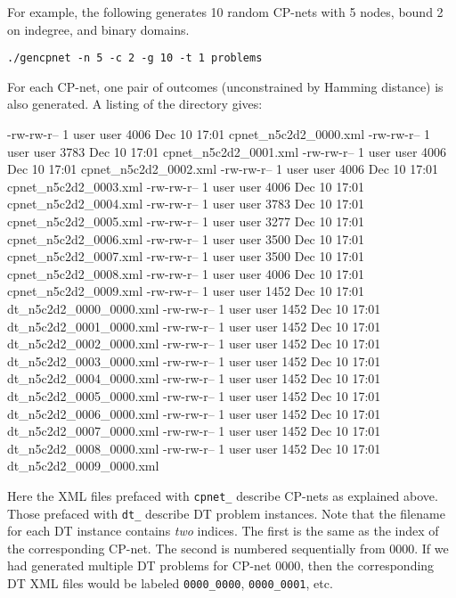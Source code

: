 \documentclass{article}
\begin{document}
For example, the following generates 10 random CP-nets with 5 nodes,
bound 2 on indegree, and binary domains.  
\begin{verbatim}
./gencpnet -n 5 -c 2 -g 10 -t 1 problems
\end{verbatim}
For each CP-net, one pair of
outcomes (unconstrained by Hamming distance) is also generated. 
A listing of the directory gives:
\begin{verbnobox}[\small]
-rw-rw-r-- 1 user user 4006 Dec 10 17:01 cpnet_n5c2d2_0000.xml
-rw-rw-r-- 1 user user 3783 Dec 10 17:01 cpnet_n5c2d2_0001.xml
-rw-rw-r-- 1 user user 4006 Dec 10 17:01 cpnet_n5c2d2_0002.xml
-rw-rw-r-- 1 user user 4006 Dec 10 17:01 cpnet_n5c2d2_0003.xml
-rw-rw-r-- 1 user user 4006 Dec 10 17:01 cpnet_n5c2d2_0004.xml
-rw-rw-r-- 1 user user 3783 Dec 10 17:01 cpnet_n5c2d2_0005.xml
-rw-rw-r-- 1 user user 3277 Dec 10 17:01 cpnet_n5c2d2_0006.xml
-rw-rw-r-- 1 user user 3500 Dec 10 17:01 cpnet_n5c2d2_0007.xml
-rw-rw-r-- 1 user user 3500 Dec 10 17:01 cpnet_n5c2d2_0008.xml
-rw-rw-r-- 1 user user 4006 Dec 10 17:01 cpnet_n5c2d2_0009.xml
-rw-rw-r-- 1 user user 1452 Dec 10 17:01 dt_n5c2d2_0000_0000.xml
-rw-rw-r-- 1 user user 1452 Dec 10 17:01 dt_n5c2d2_0001_0000.xml
-rw-rw-r-- 1 user user 1452 Dec 10 17:01 dt_n5c2d2_0002_0000.xml
-rw-rw-r-- 1 user user 1452 Dec 10 17:01 dt_n5c2d2_0003_0000.xml
-rw-rw-r-- 1 user user 1452 Dec 10 17:01 dt_n5c2d2_0004_0000.xml
-rw-rw-r-- 1 user user 1452 Dec 10 17:01 dt_n5c2d2_0005_0000.xml
-rw-rw-r-- 1 user user 1452 Dec 10 17:01 dt_n5c2d2_0006_0000.xml
-rw-rw-r-- 1 user user 1452 Dec 10 17:01 dt_n5c2d2_0007_0000.xml
-rw-rw-r-- 1 user user 1452 Dec 10 17:01 dt_n5c2d2_0008_0000.xml
-rw-rw-r-- 1 user user 1452 Dec 10 17:01 dt_n5c2d2_0009_0000.xml
\end{verbnobox}
Here the XML files prefaced with \verb|cpnet_| describe CP-nets as
explained above.  Those prefaced with \verb|dt_| describe DT problem
instances.  Note that the filename for each DT instance contains
\emph{two} indices.  The first is the same as the index of the
corresponding CP-net.  The second is numbered sequentially from 0000.
If we had generated multiple DT problems for CP-net 0000, then the
corresponding DT XML files would be labeled \verb|0000_0000|,
\verb|0000_0001|, etc.
\end{document}

